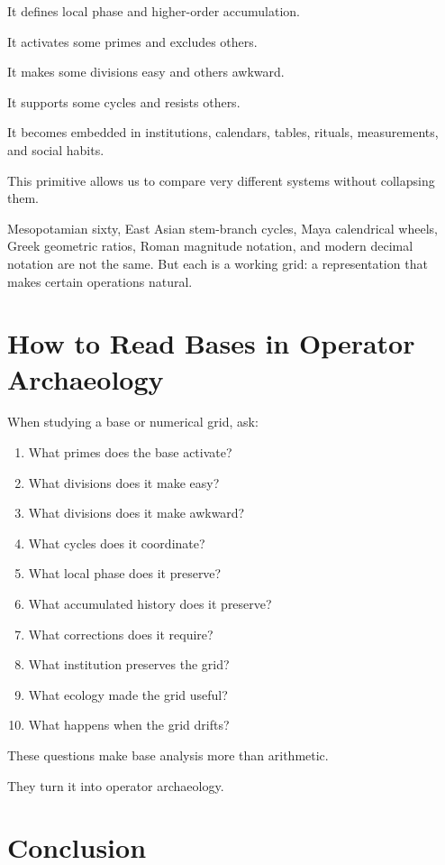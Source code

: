 \documentclass[11pt]{book}
\begin{document}
It defines local phase and higher-order accumulation.

It activates some primes and excludes others.

It makes some divisions easy and others awkward.

It supports some cycles and resists others.

It becomes embedded in institutions, calendars, tables, rituals, measurements, and social habits.

This primitive allows us to compare very different systems without collapsing them.

Mesopotamian sixty, East Asian stem-branch cycles, Maya calendrical wheels, Greek geometric ratios, Roman magnitude notation, and modern decimal notation are not the same. But each is a working grid: a representation that makes certain operations natural.

\section{How to Read Bases in Operator Archaeology}

When studying a base or numerical grid, ask:

\begin{enumerate}[label=\arabic*.]
    \item What primes does the base activate?
    \item What divisions does it make easy?
    \item What divisions does it make awkward?
    \item What cycles does it coordinate?
    \item What local phase does it preserve?
    \item What accumulated history does it preserve?
    \item What corrections does it require?
    \item What institution preserves the grid?
    \item What ecology made the grid useful?
    \item What happens when the grid drifts?
\end{enumerate}

These questions make base analysis more than arithmetic.

They turn it into operator archaeology.

\section{Conclusion}
\end{document}
